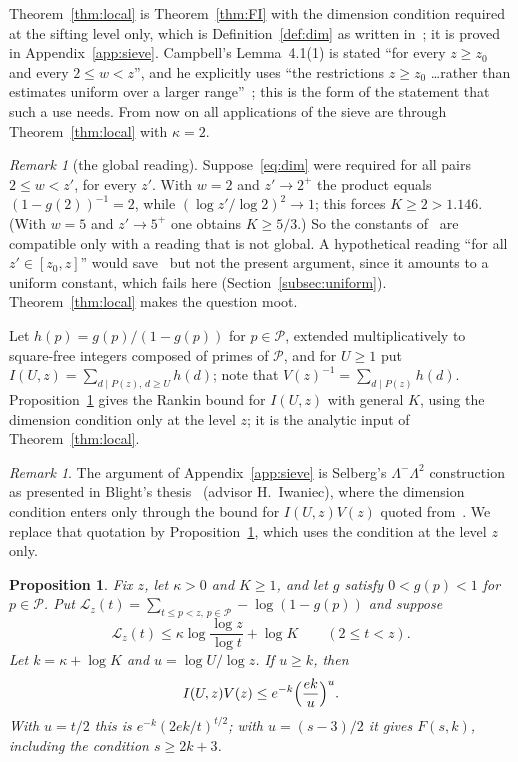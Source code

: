 \documentclass[preprint,11pt]{elsarticle}
\newtheorem{proposition}[theorem]{Proposition}
\theoremstyle{definition}
\theoremstyle{remark}
\newtheorem{remark}[theorem]{Remark}
\newcommand{\cP}{\mathcal{P}}
\newcommand{\cL}{\mathcal{L}}
\newcommand{\C}{\cite{Campbell2026}}
\numberwithin{equation}{section}
\begin{document}
Theorem~\ref{thm:local} is Theorem~\ref{thm:FI} with the dimension
condition required at the sifting level only, which is
Definition~\ref{def:dim} as written in~\cite[(2.1)]{Campbell2026}; it is
proved in Appendix~\ref{app:sieve}. Campbell's Lemma~4.1(1) is stated
``for every $z\ge z_0$ and every $2\le w<z$'', and he explicitly uses ``the
restrictions $z\ge z_0$ \ldots rather than estimates uniform over a larger
range''~\cite[\S4]{Campbell2026}; this is the form of the statement that
such a use needs. From now on all applications of the sieve are through
Theorem~\ref{thm:local} with $\kappa=2$.

\begin{remark}[the global reading]\label{rem:global}
Suppose~\eqref{eq:dim} were required for all pairs $2\le w<z'$, for every
$z'$. With $w=2$ and $z'\to2^+$ the product equals $(1-g(2))^{-1}=2$, while
$(\log z'/\log2)^2\to1$; this forces $K\ge2>1.146$. (With $w=5$ and
$z'\to5^+$ one obtains $K\ge5/3$.) So the constants of~\C{} are
compatible only with a reading that is not global. A hypothetical reading ``for all
$z'\in[z_0,z]$'' would save~\C{} but not the present argument, since it
amounts to a uniform constant, which fails here
(Section~\ref{subsec:uniform}). Theorem~\ref{thm:local} makes the question
moot.
\end{remark}

Let $h(p)=g(p)/(1-g(p))$ for $p\in\cP$, extended multiplicatively to
square-free integers composed of primes of $\cP$, and for $U\ge1$ put
$I(U,z)=\sum_{d\mid P(z),\,d\ge U}h(d)$; note that
$V(z)^{-1}=\sum_{d\mid P(z)}h(d)$. Proposition~\ref{prop:rankinK} gives the
Rankin bound for $I(U,z)$ with general $K$, using the dimension condition
only at the level $z$; it is the analytic input of Theorem~\ref{thm:local}.

\begin{remark}\label{rem:evidence}
The argument of Appendix~\ref{app:sieve} is Selberg's $\Lambda^-\Lambda^2$
construction as presented in Blight's thesis~\cite[\S\S2.2--2.3]{Blight2010}
(advisor H.~Iwaniec), where the dimension condition enters only through
the bound for $I(U,z)V(z)$ quoted from~\cite[p.~111]{FI2010}. We replace
that quotation by Proposition~\ref{prop:rankinK}, which uses the condition
at the level $z$ only.
\end{remark}


\begin{proposition}\label{prop:rankinK}
Fix $z$, let $\kappa>0$ and $K\ge1$, and let $g$ satisfy $0<g(p)<1$ for $p\in\cP$. Put
$\cL_z(t)=\sum_{t\le p<z,\,p\in\cP}-\log(1-g(p))$ and suppose
\[
  \cL_z(t)\le\kappa\log\frac{\log z}{\log t}+\log K\qquad(2\le t<z).
\]
Let $k=\kappa+\log K$ and $u=\log U/\log z$. If $u\ge k$, then
\[
  I(U,z)V(z)\le e^{-k}\Bigl(\frac{ek}{u}\Bigr)^{u}.
\]
With $u=t/2$ this is $e^{-k}(2ek/t)^{t/2}$; with $u=(s-3)/2$ it gives
$F(s,k)$, including the condition $s\ge2k+3$.
\end{proposition}
\end{document}
